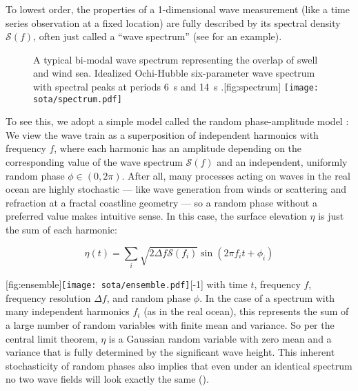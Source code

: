 To lowest order, the properties of a 1-dimensional wave measurement (like a time series observation at a fixed location) are fully described by its spectral density $\mathcal{S}(f)$, often just called a \enquote{wave spectrum} (see  for an example).

\begin{figure}
    \strictpagechecktrue
    \begin{sidecaption}{A typical bi-modal wave spectrum representing the overlap of swell and wind sea. Idealized Ochi-Hubble six-parameter wave spectrum with spectral peaks at periods \SI{6}{\second} and \SI{14}{\second} \citep{ochi_michel_k_six-parameter_1976}.}[fig:spectrum]
		\antimpjustification
		\texttt{[image: sota/spectrum.pdf]}
	\end{sidecaption}
\end{figure}

To see this, we adopt a simple model called the random phase-amplitude model \citep[see \eg][]{holthuijsen_waves_2010}: We view the wave train as a superposition of independent harmonics with frequency $f$, where each harmonic has an amplitude depending on the corresponding value of the wave spectrum $\mathcal{S}(f)$ and an independent, uniformly random phase $\phi \in (0, 2\pi)$. After all, many processes acting on waves in the real ocean are highly stochastic --- like wave generation from winds or scattering and refraction at a fractal coastline geometry --- so a random phase without a preferred value makes intuitive sense. In this case, the surface elevation $\eta$ is just the sum of each harmonic:

\begin{equation}
    \eta(t) = \sum_i \sqrt{2 \Delta f \mathcal{S}(f_i)} \sin(2\pi f_i t + \phi_i)
\end{equation}

[fig:ensemble]{\texttt{[image: sota/ensemble.pdf]}}[-1]
%
with time $t$, frequency $f$, frequency resolution $\Delta f$, and random phase $\phi$. In the case of a spectrum with many independent harmonics $f_i$ (as in the real ocean), this represents the sum of a large number of random variables with finite mean and variance. So per the central limit theorem, $\eta$ is a Gaussian random variable with zero mean and a variance that is fully determined by the significant wave height. This inherent stochasticity of random phases also implies that even under an identical spectrum no two wave fields will look exactly the same ().

